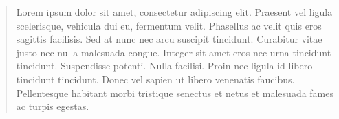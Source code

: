 \begin{quote}
Lorem ipsum dolor sit amet, consectetur adipiscing elit. Praesent vel ligula scelerisque, vehicula dui eu, fermentum velit. 
Phasellus ac velit quis eros sagittis facilisis. Sed at nunc nec arcu suscipit tincidunt. 
Curabitur vitae justo nec nulla malesuada congue. Integer sit amet eros nec urna tincidunt tincidunt. 
Suspendisse potenti. Nulla facilisi. Proin nec ligula id libero tincidunt tincidunt. 
Donec vel sapien ut libero venenatis faucibus. Pellentesque habitant morbi tristique senectus et netus et malesuada fames ac turpis egestas.
\end{quote}